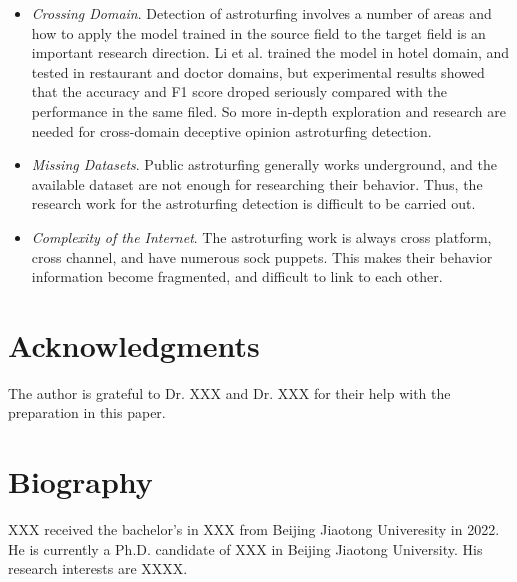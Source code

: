\documentclass[lettersize,journal]{IEEEtran}
\begin{document}
\begin{itemize}
\item \emph{Crossing Domain}.
Detection of astroturfing involves a number of areas and how to apply the model trained in the source field to the target field is an important research direction. Li et al. trained the model in hotel domain, and tested in restaurant and doctor domains, but experimental results showed that the accuracy and F1 score droped seriously compared with the performance in the same filed\cite{li2014towards}. So more in-depth exploration and research are needed for cross-domain deceptive opinion astroturfing detection\cite{ren2019learning}.

\item \emph{Missing Datasets}.
Public astroturfing generally works underground, and the available dataset are not enough for researching their behavior. Thus, the research work for the astroturfing detection is difficult to be carried out.

\item \emph{Complexity of the Internet}.
The astroturfing work is always cross platform, cross channel, and have numerous sock puppets. This makes their behavior information become fragmented, and difficult to link to each other.

\end{itemize}




\section*{Acknowledgments}


The author is grateful to Dr. XXX and Dr. XXX for their help with the preparation in this paper.






\newpage

\section{Biography}

\vspace{-33pt}
\begin{IEEEbiography}{XXX} 
received the bachelor's in XXX from Beijing Jiaotong Univeresity in 2022. He is currently a Ph.D. candidate of XXX in Beijing Jiaotong University. His research interests are XXXX.
\end{IEEEbiography}

\vspace{11pt}

\vfill
\end{document}
